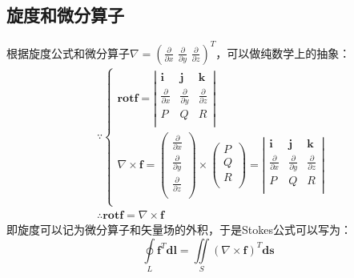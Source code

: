 \subsection{旋度和微分算子}

根据旋度公式和微分算子$\nabla =\left( \frac{\partial}{\partial x}\,\,\frac{\partial}{\partial y}\,\,\frac{\partial}{\partial z} \right) ^T$，可以做纯数学上的抽象：
\begin{align*}
&\because \begin{cases}
	\mathbf{rot}\boldsymbol{f}=\left| \begin{matrix}
	\mathbf{i}&		\mathbf{j}&		\mathbf{k}\\
	\frac{\partial}{\partial x}&		\frac{\partial}{\partial y}&		\frac{\partial}{\partial z}\\
	P&		Q&		R\\
\end{matrix} \right|\\
	\nabla \times \boldsymbol{f}=\left( \begin{array}{c}
	\frac{\partial}{\partial x}\\
	\frac{\partial}{\partial y}\\
	\frac{\partial}{\partial z}\\
\end{array} \right) \times \left( \begin{array}{c}
	P\\
	Q\\
	R\\
\end{array} \right) =\left| \begin{matrix}
	\mathbf{i}&		\mathbf{j}&		\mathbf{k}\\
	\frac{\partial}{\partial x}&		\frac{\partial}{\partial y}&		\frac{\partial}{\partial z}\\
	P&		Q&		R\\
\end{matrix} \right|\\
\end{cases} \\
&\therefore \mathbf{rot}\boldsymbol{f}=\nabla \times \boldsymbol{f}
\end{align*}
即旋度可以记为微分算子和矢量场的外积，于是Stokes公式可以写为：
\[
\oint\limits_L{\boldsymbol{f}^T\boldsymbol{dl}}=\iint\limits_S{\left( \nabla \times \boldsymbol{f} \right) ^T\boldsymbol{ds}}
\]




